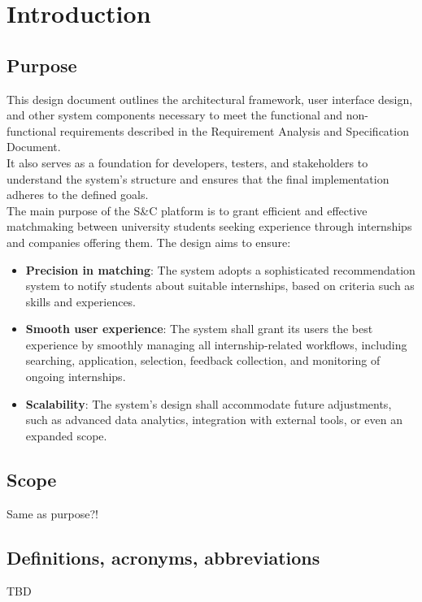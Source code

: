 \documentclass[11pt,twoside]{article}
\begin{document}
\newpage

\tableofcontents

\newpage

\section{Introduction}
	\subsection{Purpose}
This design document outlines the architectural framework, user interface design, and other system components necessary to meet the functional and non-functional requirements described in the Requirement Analysis and Specification Document. \\
It also serves as a foundation for developers, testers, and stakeholders to understand the system's structure and ensures that the final implementation adheres to the defined goals. \\
The main purpose of the S\&C platform is to grant efficient and effective matchmaking between university students seeking experience through internships and companies offering them. The design aims to ensure:
\begin{itemize}
\item \textbf{Precision in matching}: The system adopts a sophisticated recommendation system to notify students about suitable internships, based on criteria such as skills and experiences.
\item \textbf{Smooth user experience}: The system shall grant its users the best experience by smoothly managing all internship-related workflows, including searching, application, selection, feedback collection, and monitoring of ongoing internships.
\item \textbf{Scalability}: The system's design shall accommodate future adjustments, such as advanced data analytics, integration with external tools, or even an expanded scope.
\end{itemize}

	\subsection{Scope}
Same as purpose?!

	\subsection{Definitions, acronyms, abbreviations}
TBD
\end{document}
